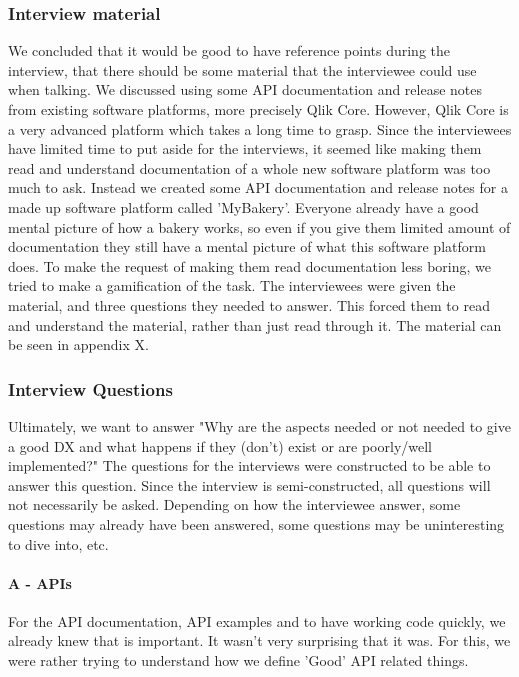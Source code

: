 \documentclass{article}
\begin{document}
\subsubsection{Interview material}
We concluded that it would be good to have reference points during the interview,
that there should be some material that the interviewee could use when talking.
We discussed using some API documentation and release notes from existing software platforms,
more precisely Qlik Core. However, Qlik Core is a very advanced platform which takes a long time
to grasp. Since the interviewees have limited time to put aside for the interviews, it seemed
like making them read and understand documentation of a whole new software platform was too much to ask.
Instead we created some API documentation and release notes for a made up software platform
called 'MyBakery'. Everyone already have a good mental picture of how a bakery works,
so even if you give them limited amount of documentation they still have a mental picture
of what this software platform does. To make the request of making them read documentation less boring,
we tried to make a gamification of the task. The interviewees were given the material, and
three questions they needed to answer. This forced them to read and understand the material, rather
than just read through it. The material can be seen in appendix X.

\subsubsection{Interview Questions}

Ultimately, we want to answer "Why are the aspects needed or not needed
to give a good DX and what happens if they (don’t) exist or are poorly/well implemented?"
The questions for the interviews were constructed to be able to answer this question.
Since the interview is semi-constructed, all questions will not necessarily be asked.
Depending on how the interviewee answer, some questions may already have been answered,
some questions may be uninteresting to dive into, etc.
\paragraph{A - APIs}
For the API documentation, API examples and to have working code quickly, we
already knew that is important. It wasn't very surprising that it was.
For this, we were rather trying to understand how we define 'Good' API related things.
\end{document}
